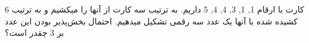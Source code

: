 6 کارت با ارقام 
1, 1, 3, 4, 4, 5 داریم.
به ترتیب سه کارت از آنها را میکشیم و به ترتیب کشیده شده با آنها یک عدد سه رقمی تشکیل میدهیم.
احتمال بخش‌پذیر بودن این عدد بر 3 چقدر است؟